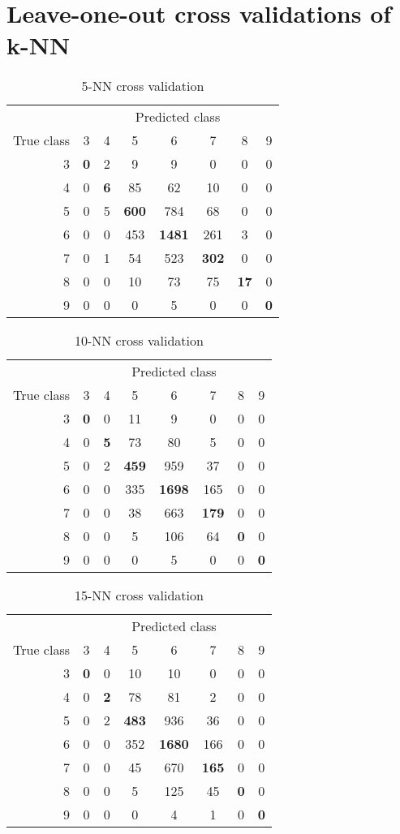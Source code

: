 \documentclass{report}
\begin{document}
\section{Leave-one-out cross validations of k-NN}

\begin{table}
\centering
\begin{tabular}{r | *{7}{c}}
& \multicolumn{7}{c}{Predicted class} \\
True class & 3&4&5&6&7&8&9 \\
\hline
3 & \textbf{0}&2&9&9&0&0&0 \\
4 & 0&\textbf{6}&85&62&10&0&0 \\
5 & 0&5&\textbf{600}&784&68&0&0 \\
6 & 0&0&453&\textbf{1481}&261&3&0 \\
7 & 0&1&54&523&\textbf{302}&0&0 \\
8 & 0&0&10&73&75&\textbf{17}&0 \\
9 & 0&0&0&5&0&0&\textbf{0} \\
\end{tabular}
\caption{5-NN cross validation}
\end{table}
\begin{table}
\centering
\begin{tabular}{r | *{7}{c}}
& \multicolumn{7}{c}{Predicted class} \\
True class & 3&4&5&6&7&8&9 \\
\hline
3 & \textbf{0}&0&11&9&0&0&0 \\
4 & 0&\textbf{5}&73&80&5&0&0 \\
5 & 0&2&\textbf{459}&959&37&0&0 \\
6 & 0&0&335&\textbf{1698}&165&0&0 \\
7 & 0&0&38&663&\textbf{179}&0&0 \\
8 & 0&0&5&106&64&\textbf{0}&0 \\
9 & 0&0&0&5&0&0&\textbf{0} \\
\end{tabular}
\caption{10-NN cross validation}
\end{table}
\begin{table}
\centering
\begin{tabular}{r | *{7}{c}}
& \multicolumn{7}{c}{Predicted class} \\
True class & 3&4&5&6&7&8&9 \\
\hline
3 & \textbf{0}&0&10&10&0&0&0 \\
4 & 0&\textbf{2}&78&81&2&0&0 \\
5 & 0&2&\textbf{483}&936&36&0&0 \\
6 & 0&0&352&\textbf{1680}&166&0&0 \\
7 & 0&0&45&670&\textbf{165}&0&0 \\
8 & 0&0&5&125&45&\textbf{0}&0 \\
9 & 0&0&0&4&1&0&\textbf{0} \\
\end{tabular}
\caption{15-NN cross validation}
\end{table}
\end{document}

